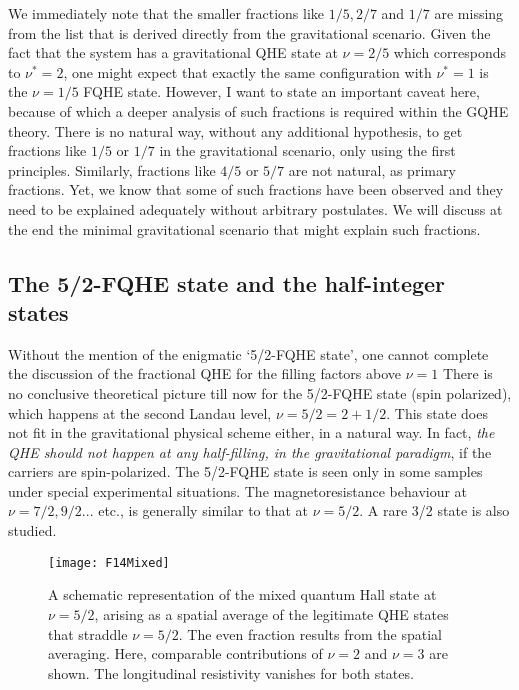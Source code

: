 \documentclass[aps,preprint,12pt,tightenlines]{revtex4}%
\begin{document}
We immediately note that the smaller fractions like $1/5,2/7$ and $1/7$ are
missing from the list that is derived directly from the gravitational
scenario. Given the fact that the system has a gravitational QHE state at
$\nu=2/5$ which corresponds to $\nu^{\ast}=2$, one might expect that exactly
the same configuration with $\nu^{\ast}=1$ is the $\nu=1/5$ FQHE state.
However, I want to state an important caveat here, because of which a deeper
analysis of such fractions is required within the GQHE theory. There is no
natural way, without any additional hypothesis, to get fractions like $1/5$ or
$1/7$ in the gravitational scenario, only using the first principles.
Similarly, fractions like $4/5$ or $5/7$ are not natural, as primary
fractions. Yet, we know that some of such fractions have been observed and
they need to be explained adequately without arbitrary postulates. We will
discuss at the end the minimal gravitational scenario that might explain such fractions.

\subsection{The 5/2-FQHE state and the half-integer states}

Without the mention of the enigmatic `5/2-FQHE state', one cannot complete the
discussion of the fractional QHE for the filling factors above $\nu=1$
\cite{Willett-FiveTwo} There is no conclusive theoretical picture till now for
the 5/2-FQHE state (spin polarized), which happens at the second Landau level,
$\nu=5/2=2+1/2$. This state does not fit in the gravitational physical scheme
either, in a natural way. In fact, \emph{the QHE should not happen at any
half-filling, in the gravitational paradigm}, if the carriers are
spin-polarized. The 5/2-FQHE state is seen only in some samples under special
experimental situations. The magnetoresistance behaviour at $\nu=7/2,9/2...$
etc., is generally similar to that at $\nu=5/2$. A rare 3/2 state is also
studied. 

\begin{figure}
	\centering
	\texttt{[image: F14Mixed]}
	\caption{A schematic representation of the mixed quantum Hall state at $\nu=5/2$, arising as a spatial average of the legitimate QHE states that straddle $\nu=5/2$. The even fraction results from the spatial averaging. Here, comparable contributions of $\nu=2$ and $\nu=3$ are shown. The longitudinal resistivity vanishes for both states.}
	\label{fig:mixed}
\end{figure}
\end{document}
